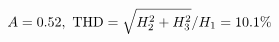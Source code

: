 \documentclass[preview]{standalone}
\begin{document}
\begin{align*}
\special{dvisvgm:raw <g id='unique000'>}A=0.52,\ \text{THD}=\sqrt{H_2^2+H_3^2}/H_1=10.1\%\special{dvisvgm:raw </g>}
\end{align*}
\end{document}
